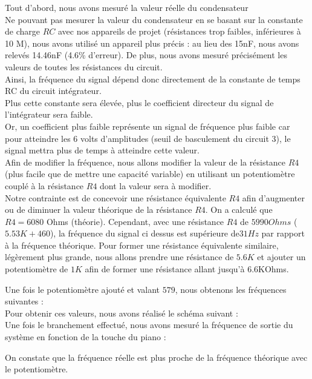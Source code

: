 {Tout d’abord, nous avons mesuré la valeur réelle du condensateur \\
Ne pouvant pas mesurer la valeur du condensateur en se basant sur la constante de charge $RC$ avec nos appareils de projet (résistances trop faibles, inférieures à 10 M), nous avons utilisé un appareil plus précis : au lieu des 15nF, nous avons relevés 14.46nF (4.6\% d’erreur).
De plus, nous avons mesuré précisément les valeurs de toutes les résistances du circuit.\\

Ainsi, la fréquence du signal dépend donc directement de la constante de temps RC du circuit intégrateur. \\
Plus cette constante sera élevée, plus le coefficient directeur du signal de l’intégrateur sera faible. \\
Or, un coefficient plus faible représente un signal de fréquence plus faible car pour atteindre les 6 volts d’amplitudes (seuil de basculement du circuit 3), 
le signal mettra plus de temps à atteindre cette valeur.\\


Afin de modifier la fréquence, nous allons modifier la valeur de la résistance $R4$ (plus facile que de mettre une capacité variable) en utilisant un potentiomètre couplé à la résistance $R4$ dont la valeur sera à modifier.\\



Notre contrainte est de concevoir une résistance équivalente $R4$ afin d’augmenter ou de diminuer la valeur théorique de la résistance $R4$. 
On a calculé que $R4=6080$ Ohms (théorie).
Cependant, avec une résistance $R4$ de $5990 Ohms$ ($5.53K+460$), la fréquence du signal ci dessus est supérieure de$ 31 Hz$ par rapport à la fréquence théorique.
Pour former une résistance équivalente similaire, légèrement plus grande, nous allons prendre une résistance de $5.6K$ et ajouter un potentiomètre de $1K$ afin de former une résistance allant jusqu’à 6.6KOhms.

Une fois le potentiomètre ajouté et valant $579$, nous obtenons les fréquences suivantes :\\

Pour obtenir ces valeurs, nous avons réalisé le schéma suivant :\\

Une fois le branchement effectué, nous avons mesuré la fréquence de sortie du système en fonction de la touche du piano :

On constate que la fréquence réelle est plus proche de la fréquence théorique avec le potentiomètre.













}
